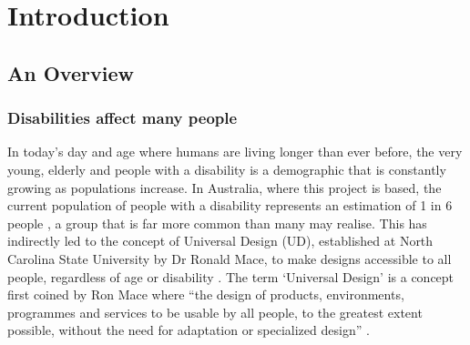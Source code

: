 
\chapter{Introduction}\label{chapter:firstchapter} %

\label{Chapter1} %


\section{An Overview}
\subsection{Disabilities affect many people}
In today's day and age where humans are living longer than ever before, the very young, elderly and people with a disability is a demographic that is constantly growing as populations increase.
In Australia, where this project is based, the current population of people with a disability represents an estimation of 1 in 6 people \cite{ausstats}, a group that is far more common than many may realise.
This has indirectly led to the concept of Universal Design (UD), established at North Carolina State University by Dr Ronald Mace, to make designs accessible to all people, regardless of age or disability \cite{ronald}.
The term ‘Universal Design’ is a concept first coined by Ron Mace where “the design of products, environments, programmes and services to be usable by all people, to the greatest extent possible, without the need for adaptation or specialized design” \cite{nda}. 


